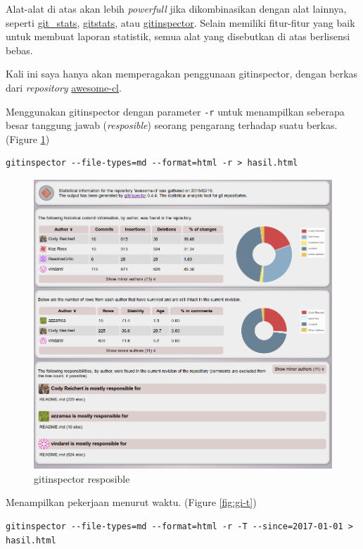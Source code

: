 \documentclass[a4paper,11pt]{article}
\begin{document}
Alat-alat di atas akan lebih \emph{powerfull} jika dikombinasikan
dengan alat lainnya, seperti
\href{https://github.com/tomgi/git\_stats}{git\_stats},
\href{https://github.com/hoxu/gitstats}{gitstats}, atau
\href{https://github.com/ejwa/gitinspector}{gitinspector}. Selain
memiliki fitur-fitur yang baik untuk membuat laporan statistik, semua
alat yang disebutkan di atas berlisensi bebas\cite{wiki-fs}.

Kali ini saya hanya akan memperagakan penggunaan gitinspector, dengan
berkas dari \emph{repository}
\href{https://github.com/CodyReichert/awesome-cl}{awesome-cl}.

Menggunakan gitinspector dengan parameter \texttt{-r} untuk
menampilkan seberapa besar tanggung jawab (\emph{resposible}) seorang
pengarang terhadap suatu berkas. (Figure \ref{fig:gi-r})

\begin{verbatim}
gitinspector --file-types=md --format=html -r > hasil.html
\end{verbatim}

\begin{figure}[tp]
  \centering
  \includegraphics[width=.8\linewidth]{img/gi-1.png}
  \caption{gitinspector resposible}
  \label{fig:gi-r}
\end{figure}

\noindent
Menampilkan pekerjaan menurut waktu. (Figure \ref{fig:gi-t})

\begin{verbatim}
gitinspector --file-types=md --format=html -r -T --since=2017-01-01 > hasil.html
\end{verbatim}
\end{document}
